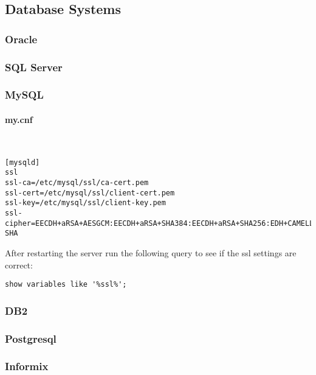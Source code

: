 
\subsection{Database Systems}

\subsubsection{Oracle}

\subsubsection{SQL Server}




\subsubsection{MySQL}

\paragraph*{my.cnf}\mbox{}\\


\begin{lstlisting}[breaklines]
[mysqld]
ssl
ssl-ca=/etc/mysql/ssl/ca-cert.pem
ssl-cert=/etc/mysql/ssl/client-cert.pem
ssl-key=/etc/mysql/ssl/client-key.pem
ssl-cipher=EECDH+aRSA+AESGCM:EECDH+aRSA+SHA384:EECDH+aRSA+SHA256:EDH+CAMELLIA256:EECDH:EDH+aRSA:+SSLv3:!aNULL:!eNULL:!LOW:!3DES:!MD5:!EXP:!PSK:!SRP:!DSS:!RC4:!SEED:!AES128:!CAMELLIA128:!ECDSA:AES256-SHA
\end{lstlisting}

After restarting the server run the following query to see if the ssl settings are correct:
\begin{lstlisting}[breaklines]
show variables like '%ssl%';
\end{lstlisting}


\subsubsection{DB2}

\subsubsection{Postgresql}

\subsubsection{Informix}
